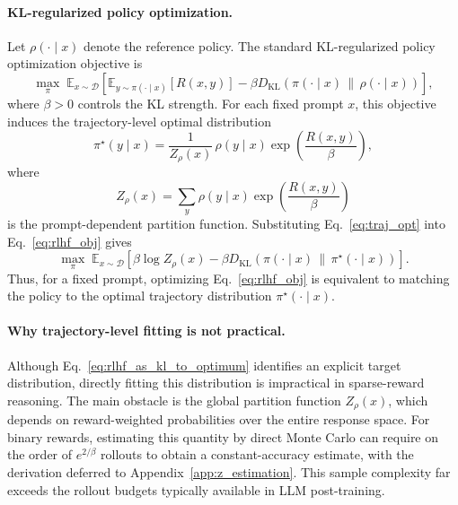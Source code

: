 \documentclass{article}
\begin{document}
\paragraph{KL-regularized policy optimization.}
Let $\rho(\cdot\mid x)$ denote the reference policy.  The standard KL-regularized policy optimization objective is
\begin{equation}
\max_{\pi}\;
\mathbb{E}_{x\sim\mathcal{D}}
\left[
\mathbb{E}_{y\sim\pi(\cdot\mid x)}[R(x,y)]
-
\beta D_{\mathrm{KL}}\!\left(\pi(\cdot\mid x)\,\|\,\rho(\cdot\mid x)\right)
\right],
\label{eq:rlhf_obj}
\end{equation}
where $\beta>0$ controls the KL strength.  For each fixed prompt $x$, this objective induces the trajectory-level optimal distribution
\begin{equation}
\pi^\star(y\mid x)
=
\frac{1}{Z_\rho(x)}\,
\rho(y\mid x)
\exp\!\left(\frac{R(x,y)}{\beta}\right),
\label{eq:traj_opt}
\end{equation}
where
\begin{equation}
Z_\rho(x)
=
\sum_y \rho(y\mid x)
\exp\!\left(\frac{R(x,y)}{\beta}\right)
\end{equation}
is the prompt-dependent partition function.  Substituting Eq.~\eqref{eq:traj_opt} into Eq.~\eqref{eq:rlhf_obj} gives 
\begin{equation}
\max_{\pi}\;
\mathbb{E}_{x\sim\mathcal{D}}
\left[
\beta\log Z_\rho(x)
-
\beta D_{\mathrm{KL}}\!\left(\pi(\cdot\mid x)\,\|\,\pi^\star(\cdot\mid x)\right)
\right].
\label{eq:rlhf_as_kl_to_optimum}
\end{equation}
Thus, for a fixed prompt, optimizing Eq.~\eqref{eq:rlhf_obj} is equivalent to matching the policy to the optimal trajectory distribution $\pi^\star(\cdot\mid x)$.

\paragraph{Why trajectory-level fitting is not practical.}
Although Eq.~\eqref{eq:rlhf_as_kl_to_optimum} identifies an explicit target distribution, directly fitting this distribution is impractical in sparse-reward reasoning.  The main obstacle is the global partition function $Z_\rho(x)$, which depends on reward-weighted probabilities over the entire response space.  For binary rewards, estimating this quantity by direct Monte Carlo can require on the order of $e^{2/\beta}$ rollouts to obtain a constant-accuracy estimate, with the derivation deferred to Appendix~\ref{app:z_estimation}.  This sample complexity far exceeds the rollout budgets typically available in LLM post-training.
\end{document}
